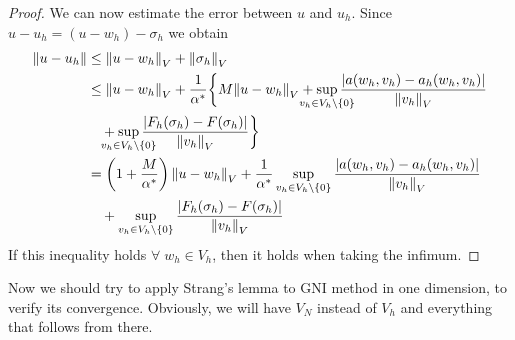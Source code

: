 \begin{proof}
    We can now estimate the error between \(u\) and \(u_h\). Since \(u-u_h = (u-w_h) - \sigma_h\) we obtain
    \begin{align*}
        \norm{u-u_h} &\leq  \norm{u-w_h}_V + \norm{\sigma_h}_V \\
        &\leq \norm{u-w_h}_V + \frac{1}{\alpha^*} \bigg\{M\norm{u-w_h}_V + \sup_{\mathclap{v_h \in V_h \backslash \left\{0\right\}}} \frac{\abs{a(w_h, v_h) - a_h(w_h, v_h)}}{\norm{v_h}_V}  \\
        & \quad + \sup_{\mathclap{v_h \in V_h \backslash \left\{0\right\}}} \frac{\abs{F_h(\sigma_h)-F(\sigma_h)}}{\norm{v_h}_V}\bigg\} \\
        &= \left(1+\frac{M}{\alpha^*}\right)\norm{u-w_h}_V + \frac{1}{\alpha^*} \sup_{v_h \in V_h \backslash \left\{0\right\}} \frac{\abs{a(w_h, v_h) - a_h(w_h, v_h)}}{\norm{v_h}_V} \\
        &\quad + \sup_{v_h \in V_h \backslash \left\{0\right\}}\frac{\abs{F_h(\sigma_h)-F(\sigma_h)}}{\norm{v_h}_V}
    \end{align*}
    If this inequality holds \(\forall \; w_h \in V_h\), then it holds when taking the infimum.
\end{proof}
Now we should try to apply Strang's lemma to GNI method in one dimension, to verify its convergence. Obviously, we will have \(V_N\) instead of \(V_h\) and everything that follows from there.

